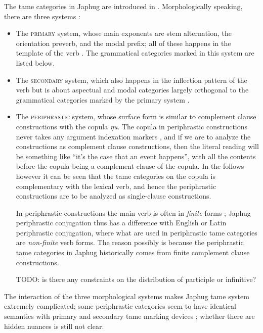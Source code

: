 \documentclass[a4paper, oneside, 12pt]{report}
\newcommand*{\citesec}[1]{\S~{#1}}
\newcommand*{\citechap}[1]{Ch~{#1}}
\newcommand*{\citetable}[1]{Table~{#1}}
\newcommand*{\citepage}[1]{p.~{#1}}
\newcommand{\form}[1]{\emph{#1}}
\newcommand{\category}[1]{\textsc{#1}}
\begin{document}
The \acs{tame} categories in Japhug 
are introduced in \citet[\citechap{21}]{jacques2021grammar}.
Morphologically speaking, there are three systems
\citep[\citepage{516}]{jacques2019egophoric}:
\begin{itemize}
    \item The \category{primary} system, 
        whose main exponents are stem alternation, the orientation preverb,
        and the modal prefix;
        all of these happens in the template of the verb \citep[\citetable{21.1}]{jacques2021grammar}.
        The grammatical categories marked in this system are listed below.
    \item The \category{secondary} system, 
        which also happens in the inflection pattern of the verb  
        but is about aspectual and modal categories 
        largely orthogonal to the grammatical categories marked by the primary system 
        \citep[\citesec{21.6}, \citesec{21.7}]{jacques2021grammar}. 
    \item The \category{periphrastic} system, 
        whose surface form is similar to complement clause constructions 
        with the copula \form{ŋu}.
        The copula in periphrastic constructions 
        never takes any argument indexation markers \citep[\citepage{1090}]{jacques2021grammar},
        and if we are to analyze the constructions as complement clause constructions,
        then the literal reading will be something like  
        ``it's the case that an event happens'',
        with all the contents before the copula 
        being a complement clause of the copula.
        In the follows however it can be seen that 
        the \acs{tame} categories on the copula 
        is complementary with the lexical verb,
        and hence the periphrastic constructions are to be analyzed 
        as single-clause constructions.

        In periphrastic constructions 
        the main verb is often in \emph{finite} forms \citep[\citepage{1081}]{jacques2021grammar};
        Japhug periphrastic conjugation thus has 
        a difference with English or Latin periphrastic conjugation,
        where what are used in periphrastic \acs{tame} categories
        are \emph{non-finite} verb forms.
        The reason possibly is because the periphrastic \acs{tame} categories in Japhug
        historically comes from finite complement clause constructions.

        TODO: is there any constraints on the distribution of participle or infinitive?
\end{itemize}
The interaction of the three morphological systems makes Japhug \acs{tame} system extremely complicated;
some periphrastic categories seem to have identical semantics with 
primary and secondary \acs{tame} marking devices \citep[\citepage{1092}]{jacques2021grammar};
whether there are hidden nuances is still not clear.
\end{document}
